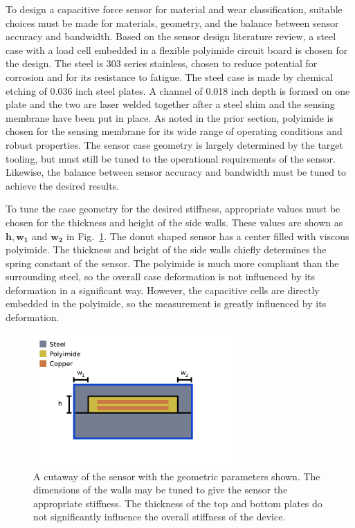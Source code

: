 To design a capacitive force sensor for material and wear classification, suitable choices must be made for
 materials, geometry, and the balance between sensor accuracy and bandwidth. 
Based on the sensor design literature review, 
 a steel case with a load cell embedded in a flexible polyimide circuit board is chosen for the design. 
The steel is 303 series stainless, chosen to reduce potential for corrosion and for its
 resistance to fatigue.
The steel case is made by chemical etching of 0.036 inch steel plates. 
A channel of 0.018 inch depth is formed on one plate and the two are laser welded together after
 a steel shim and the sensing membrane have been put in place.
As noted in the prior section, polyimide is chosen for the sensing membrane for its
 wide range of operating conditions and robust properties.
The sensor case geometry is largely determined by the target tooling, but must still be tuned to the operational
 requirements of the sensor. 
Likewise, the balance between sensor accuracy and bandwidth must be tuned to achieve the desired results.

To tune the case geometry for the desired stiffness, appropriate values must be chosen for the
 thickness and height of the side walls.
These values are shown as $\mathbf{h}, \mathbf{w_1}$ and $ \mathbf{w_2}$ in Fig.~\ref{fig:sensecut}.
The donut shaped sensor has a center filled with viscous polyimide. 
The thickness and height of the side walls chiefly determines the spring constant of the sensor.
The polyimide is much more compliant than the surrounding steel, so the overall case deformation is not 
 influenced by its deformation in a significant way.
However, the capacitive cells are directly embedded in the polyimide, so the measurement is greatly 
 influenced by its deformation.


\begin{figure}[t!]
\centering
\includegraphics[width=3in]{figures/p1_media/Fig3.png}
\caption{
A cutaway of the sensor with the geometric parameters shown. The dimensions of the walls
 may be tuned to give the sensor the appropriate stiffness. The thickness of the top and bottom plates
 do not significantly influence the overall stiffness of the device.
}
\label{fig:sensecut}
\end{figure}


